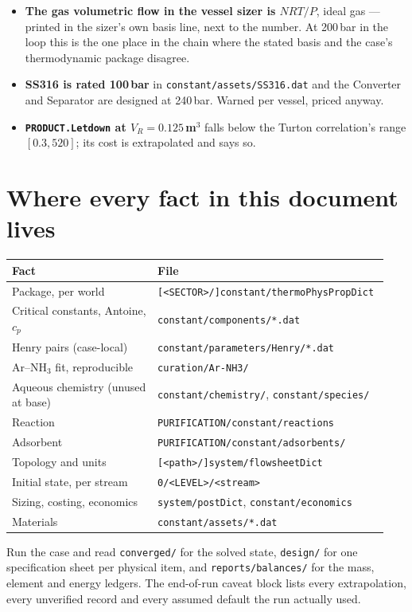 \documentclass[11pt,a4paper]{article}
\begin{document}
\begin{itemize}[leftmargin=*]
\item \textbf{The gas volumetric flow in the vessel sizer is $NRT/P$}, ideal
      gas --- printed in the sizer's own basis line, next to the number.
      At 200\,bar in the loop this is the one place in the chain where the
      stated basis and the case's thermodynamic package disagree.
\item \textbf{SS316 is rated 100\,bar} in \texttt{constant/assets/SS316.dat}
      and the Converter and Separator are designed at 240\,bar. Warned per
      vessel, priced anyway.
\item \textbf{\texttt{PRODUCT.Letdown} at $V_R = 0.125$\,m$^3$} falls below the
      Turton correlation's range $[0.3, 520]$; its cost is extrapolated and
      says so.
\end{itemize}

\section{Where every fact in this document lives}

{\small\begin{longtable}{@{}L{0.38\linewidth}L{0.56\linewidth}@{}}
\toprule
\textbf{Fact} & \textbf{File} \\
\midrule
\endhead
Package, per world & \texttt{[<SECTOR>/]constant/thermoPhysPropDict} \\
Critical constants, Antoine, $c_p$ & \texttt{constant/components/*.dat} \\
Henry pairs (case-local) & \texttt{constant/parameters/Henry/*.dat} \\
Ar--NH$_3$ fit, reproducible & \texttt{curation/Ar-NH3/} \\
Aqueous chemistry (unused at base) & \texttt{constant/chemistry/}, \texttt{constant/species/} \\
Reaction & \texttt{PURIFICATION/constant/reactions} \\
Adsorbent & \texttt{PURIFICATION/constant/adsorbents/} \\
Topology and units & \texttt{[<path>/]system/flowsheetDict} \\
Initial state, per stream & \texttt{0/<LEVEL>/<stream>} \\
Sizing, costing, economics & \texttt{system/postDict}, \texttt{constant/economics} \\
Materials & \texttt{constant/assets/*.dat} \\
\bottomrule
\end{longtable}}

Run the case and read \texttt{converged/} for the solved state,
\texttt{design/} for one specification sheet per physical item, and
\texttt{reports/balances/} for the mass, element and energy ledgers. The
end-of-run caveat block lists every extrapolation, every unverified record and
every assumed default the run actually used.
\end{document}
